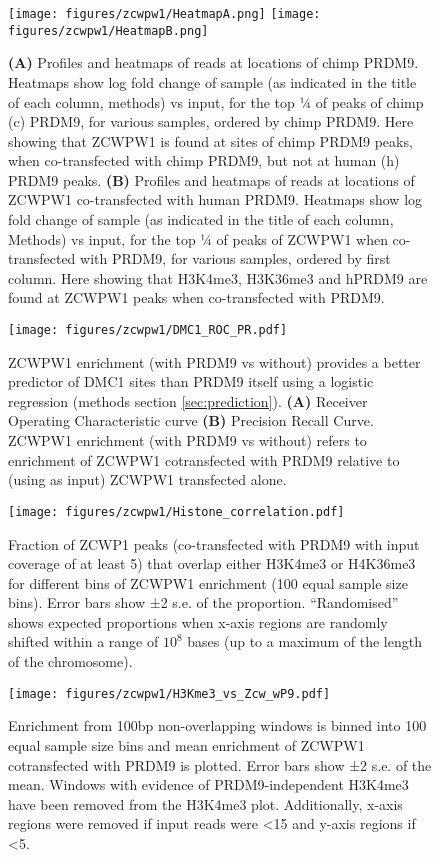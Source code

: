 \begin{figure}[H]
	\centering
	\texttt{[image: figures/zcwpw1/HeatmapA.png]}
	\texttt{[image: figures/zcwpw1/HeatmapB.png]}
	\caption[Zcwpw1 Heatmaps]{
		\textbf{(A)} Profiles and heatmaps of reads at locations of chimp PRDM9. Heatmaps show log fold change of sample (as indicated in the title of each column, methods) vs input, for the top ¼ of peaks of chimp (c) PRDM9, for various samples, ordered by chimp PRDM9. Here showing that ZCWPW1 is found at sites of chimp PRDM9 peaks, when co-transfected with chimp PRDM9, but not at human (h) PRDM9 peaks.
		\textbf{(B)} Profiles and heatmaps of reads at locations of ZCWPW1 co-transfected with human PRDM9. Heatmaps show log fold change of sample (as indicated in the title of each column, Methods) vs input, for the top ¼ of peaks of ZCWPW1 when co-transfected with PRDM9, for various samples, ordered by first column. Here showing that H3K4me3, H3K36me3 and hPRDM9 are found at ZCWPW1 peaks when co-transfected with PRDM9.
	}
	\label{fig:Heatmaps}
\end{figure}


\begin{figure}[H]
	\centering
	\texttt{[image: figures/zcwpw1/DMC1\_ROC\_PR.pdf]}
	\caption[DMC1 prediction]{
		ZCWPW1 enrichment (with PRDM9 vs without) provides a better predictor of DMC1 sites than PRDM9 itself using a logistic regression (methods section \ref{sec:prediction}).
		\textbf{(A)} Receiver Operating Characteristic curve
		\textbf{(B)} Precision Recall Curve. ZCWPW1 enrichment (with PRDM9 vs without) refers to enrichment of ZCWPW1 cotransfected with PRDM9 relative to (using as input) ZCWPW1 transfected alone.
	}
	\label{fig:ROC}
\end{figure}


\begin{figure}[H]
	\centering
	\texttt{[image: figures/zcwpw1/Histone\_correlation.pdf]}
	\caption[Histone Correlation from peaks]{
		Fraction of ZCWP1 peaks (co-transfected with PRDM9 with input coverage of at least 5) that overlap either H3K4me3 or H4K36me3 for different bins of ZCWPW1 enrichment (100 equal sample size bins). Error bars show ±2 s.e. of the proportion. ``Randomised'' shows expected proportions when x-axis regions are randomly shifted within a range of $10^8$ bases (up to a maximum of the length of the chromosome).
	}
	\label{fig:histone_corr}
\end{figure}


\begin{figure}[H]
	\centering
	\texttt{[image: figures/zcwpw1/H3Kme3\_vs\_Zcw\_wP9.pdf]}
	\caption[Histone Correlation from windows]{
		Enrichment from 100bp non-overlapping windows is binned into 100 equal sample size bins and mean enrichment of ZCWPW1 cotransfected with PRDM9 is plotted. Error bars show ±2 s.e. of the mean. Windows with evidence of PRDM9-independent H3K4me3 have been removed from the H3K4me3 plot. Additionally, x-axis regions were removed if input reads were <15 and y-axis regions if <5.
	}
	\label{fig:histone_corr2}
\end{figure}


